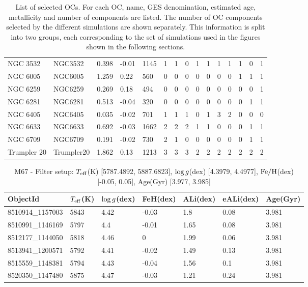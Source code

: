 \documentclass[fleqn,usenatbib]{mnras}
\begin{document}
\begin{table}
\begin{tabular}{|l l l l l || c c c c c | c c c c c|}
            NGC 3532 & NGC3532 & 0.398 & -0.01 & 1145 & 1 & 1 & 0 & 1 & 1 & 1 & 1 & 1 & 0 & 1\\
            NGC 6005 & NGC6005 & 1.259 & 0.22 & 560 & 0 & 0 & 0 & 0 & 0 & 0 & 0 & 1 & 1 & 1\\
            NGC 6259 & NGC6259 & 0.269 & 0.18 & 494 & 0 & 0 & 0 & 0 & 0 & 0 & 0 & 0 & 0 & 1\\
            NGC 6281 & NGC6281 & 0.513 & -0.04 & 320 & 0 & 0 & 0 & 0 & 0 & 0 & 0 & 0 & 1 & 1\\
            NGC 6405 & NGC6405 & 0.035 & -0.02 & 701 & 1 & 1 & 1 & 0 & 1 & 3 & 2 & 0 & 0 & 0\\
            NGC 6633 & NGC6633 & 0.692 & -0.03 & 1662 & 2 & 2 & 2 & 1 & 1 & 0 & 0 & 0 & 1 & 1\\
            NGC 6709 & NGC6709 & 0.191 & -0.02 & 730 & 2 & 1 & 0 & 0 & 0 & 0 & 0 & 0 & 1 & 1\\
            Trumpler 20 & Trumpler20 & 1.862 & 0.13 & 1213 & 3 & 3 & 3 & 2 & 2 & 2 & 2 & 2 & 2 & 2\\
            \hline
	\end{tabular}
 	\caption{List of selected OCs. For each OC, name, GES denomination, estimated age, metallicity and number of components are listed. The number of OC components selected by the different simulations are shown separately. This information is split into two groups, each corresponding to the set of simulations used in the figures shown in the following sections.}
  	\label{tab:oc_reduced_list}
\end{table}

\begin{table}
	\centering
	\begin{tabular}{l l l l l l l} 
		\hline
            ObjectId & $T_{\mathrm{eff}}$(K) & $\mathrm{log} \, g$(dex) & FeH(dex) & ALi(dex) & eALi(dex) & Age(Gyr)\\
		\hline
            8510914\_1157003 & 5843 & 4.42 & -0.03 & 1.8 & 0.08 & 3.981\\ 
            8510991\_1146169 & 5797 & 4.4 & -0.01 & 1.65 & 0.08 & 3.981\\ 
            8512177\_1144050 & 5818 & 4.46 & 0 & 1.99 & 0.06 & 3.981\\ 
            8513941\_1200571 & 5792 & 4.41 & -0.02 & 1.49 & 0.13 & 3.981\\ 
            8515559\_1148381 & 5794 & 4.43 & -0.04 & 1.56 & 0.1 & 3.981\\ 
            8520350\_1147480 & 5875 & 4.47 & -0.03 & 1.21 & 0.24 & 3.981\\ 
            \hline
	\end{tabular}
 	\caption{M67 - Filter setup: $T_{\mathrm{eff}}$(K) [5787.4892, 5887.6823], $\mathrm{log} \, g$(dex) [4.3979, 4.4977], $\mathrm{Fe}/\mathrm{H}$(dex) [-0.05, 0.05], Age(Gyr) [3.977, 3.985]}
	\label{tab:oc_m67}
\end{table}
\end{document}

